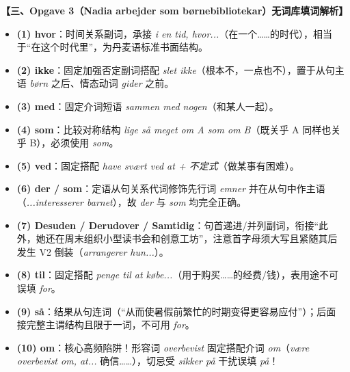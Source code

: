 \begin{answerbox}
\textbf{\color{NCDNavy}【三、Opgave 3（Nadia arbejder som børnebibliotekar）无词库填词解析】}
\begin{itemize}
  \item \textbf{(1) hvor}：时间关系副词，承接 \textit{i en tid, hvor...}（在一个……的时代），相当于“在这个时代里”，为丹麦语标准书面结构。
  \item \textbf{(2) ikke}：固定加强否定副词搭配 \textit{slet ikke}（根本不，一点也不），置于从句主语 \textit{børn} 之后、情态动词 \textit{gider} 之前。
  \item \textbf{(3) med}：固定介词短语 \textit{sammen med nogen}（和某人一起）。
  \item \textbf{(4) som}：比较对称结构 \textit{lige så meget om A som om B}（既关乎 A 同样也关乎 B），必须使用 \textit{som}。
  \item \textbf{(5) ved}：固定搭配 \textit{have svært ved at + 不定式}（做某事有困难）。
  \item \textbf{(6) der / som}：定语从句关系代词修饰先行词 \textit{emner} 并在从句中作主语（\textit{...interesserer barnet}），故 \textit{der} 与 \textit{som} 均完全正确。
  \item \textbf{(7) Desuden / Derudover / Samtidig}：句首递进/并列副词，衔接“此外，她还在周末组织小型读书会和创意工坊”，注意首字母须大写且紧随其后发生 V2 倒装（\textit{arrangerer hun...}）。
  \item \textbf{(8) til}：固定搭配 \textit{penge til at købe...}（用于购买……的经费/钱），表用途不可误填 \textit{for}。
  \item \textbf{(9) så}：结果从句连词（“从而使暑假前繁忙的时期变得更容易应付”）；后面接完整主谓结构且限于一词，不可用 \textit{for}。
  \item \textbf{(10) om}：核心高频陷阱！形容词 \textit{overbevist} 固定搭配介词 \textit{om}（\textit{være overbevist om, at...} 确信……），切忌受 \textit{sikker på} 干扰误填 \textit{på}！
\end{itemize}
\end{answerbox}

